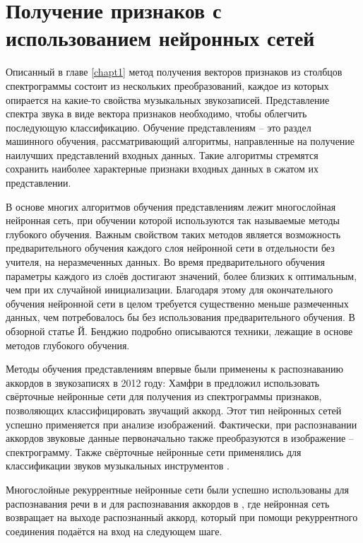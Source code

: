 \chapter{Получение признаков с использованием нейронных сетей}
\label{chapt2}

Описанный в главе \ref{chapt1} метод получения векторов признаков из столбцов
спектрограммы состоит из нескольких преобразований, каждое из которых опирается
на какие-то свойства музыкальных звукозаписей. Представление спектра звука в
виде вектора признаков необходимо, чтобы облегчить последующую классификацию.
Обучение представлениям -- это раздел машинного обучения, рассматривающий
алгоритмы, направленные на получение наилучших представлений входных данных.
Такие алгоритмы стремятся сохранить наиболее характерные признаки входных данных
в сжатом их представлении.

В основе многих алгоритмов обучения представлениям лежит многослойная нейронная
сеть, при обучении которой используются так называемые методы глубокого
обучения. Важным свойством таких методов является возможность предварительного
обучения каждого слоя нейронной сети в отдельности без учителя, на
неразмеченных данных. Во время предварительного обучения параметры каждого из
слоёв достигают значений, более близких к оптимальным, чем при их случайной
инициализации. Благодаря этому для окончательного обучения нейронной сети в
целом требуется существенно меньше размеченных данных, чем потребовалось бы без
использования предварительного обучения. В обзорной статье Й. Бенджио
\cite{Bengio2009} подробно описываются техники, лежащие в основе методов
глубокого обучения.

Методы обучения представлениям впервые были применены к распознаванию аккордов в
звукозаписях в 2012 году: Хамфри в \cite{Humphrey2012} предложил использовать
свёрточные нейронные сети для получения из спектрограммы признаков, позволяющих
классифицировать звучащий аккорд. Этот тип нейронных сетей успешно применяется
при анализе изображений. Фактически, при распознавании аккордов звуковые данные
первоначально также преобразуются в изображение -- спектрограмму. Также
свёрточные нейронные сети применялись для классификации звуков музыкальных
инструментов \cite{Humphrey2011}.

Многослойные рекуррентные нейронные сети были успешно использованы для
распознавания речи в \cite{Maas2012} и для распознавания аккордов в
\cite{BoulangerLewandowski2013}, где нейронная сеть возвращает на выходе
распознанный аккорд, который при помощи рекуррентного соединения подаётся на
вход на следующем шаге.

